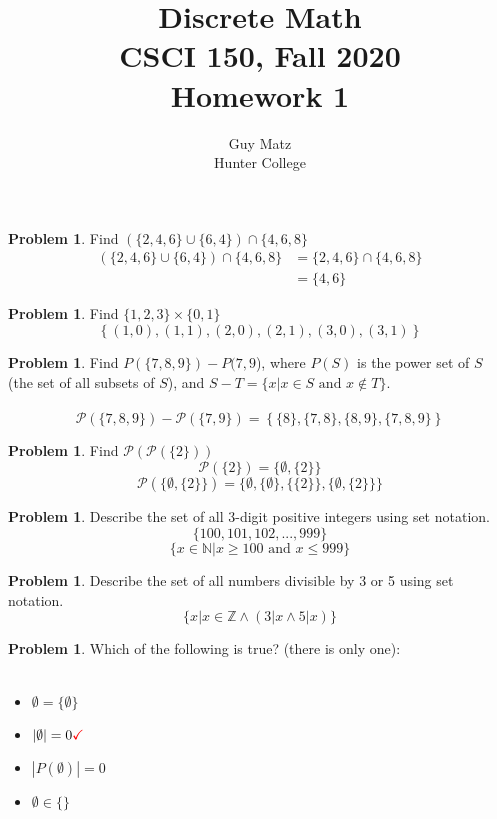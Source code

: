 \documentclass[10pt,leqno ]{article}
\title{Discrete Math\\
CSCI 150, Fall 2020\\
Homework 1}
\author{Guy Matz \\
Hunter College}
\theoremstyle{definition}
\newtheorem{problem}[theorem]{Problem}
\begin{document}
\begin{problem} Find $(\{2,4,6\} \cup  \{6,4\}) \cap \{4,6,8\}$
\\
\Large
\begin{align*}
(\{2,4,6\} \cup  \{6,4\}) \cap \{4,6,8\} &= \{2,4,6\} \cap \{4,6,8\}\\
        &=  \{4,6\}
\end{align*}
\end{problem}
\newpage

\begin{problem} Find $\{1,2,3\} \times \{0,1\}$
\\
\Large
$$\left\{ (1,0), (1,1), (2,0), (2,1), (3,0), (3,1) \right\}$$
\end{problem}
\newpage
\begin{problem} Find $P(\{7,8,9\})-P({7,9}$), where $P(S)$ is the power set of $S$ (the set of all subsets of $S$), and $S-T = \{x|x \in S \text{ and } x \notin T\}$.
\\\\
\Large
$$\mathcal{P}(\{7,8,9\}) - \mathcal{P}(\{7,9\}) = \left\{ \{8\}, \{7,8\}, \{8, 9\} , \{7,8,9\} \right\}$$
\end{problem}
\newpage
\begin{problem} Find $\mathcal{P}(\mathcal{P}(\{2\}))$
\\
\Large
$$\mathcal{P}(\{2\}) = \{\emptyset, \{2\}\}$$
$$\mathcal{P}(\{\emptyset, \{2\}\}) = \{\emptyset, \{ \emptyset \}, \{\{2\}\}, \{\emptyset, \{2\}\}\}$$
\end{problem}
\newpage
\begin{problem} Describe the set of all 3-digit positive integers using set notation.
\\
\Large
$$\{100, 101, 102, ... , 999\}$$
$$ \{ x \in \mathbb{N}| x \geq 100 \text{ and } x \leq 999 \}$$
\end{problem}
\newpage
\begin{problem} Describe the set of all numbers divisible by 3 or 5 using set notation.
\\
\Large
$$\{x | x \in \mathbb{Z} \wedge (3 | x \wedge 5|x) \}$$
\end{problem}
\newpage

\begin{problem} Which  of  the  following  is  true?   (there  is  only  one):
\\\\
\begin{itemize}
\item $\emptyset=\{\emptyset\}$
\item $|\emptyset|=  0 \color{red}\checkmark$
\item $|P(\emptyset)|= 0$
\item $\emptyset \in \{ \}$
\end{itemize}
\Large

\end{problem}
\newpage
\end{document}
